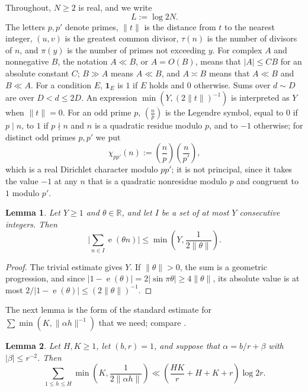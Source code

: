 \documentclass[11pt]{amsart}
\numberwithin{equation}{section}
\numberwithin{figure}{section}
\newtheorem{lemma}{Lemma}[section]
\theoremstyle{definition}
\newcommand{\R}{\mathbb{R}}
\newcommand{\e}{\operatorname{e}}
\begin{document}
Throughout, $N\ge2$ is real, and we write
\begin{equation}\label{eq:L-def}
  L:=\log 2N.
\end{equation}
The letters $p,p'$ denote primes, $\|t\|$ is the distance from $t$ to the
nearest integer, $(u,v)$ is the greatest common divisor, $\tau(n)$ is the
number of divisors of $n$, and $\pi(y)$ is the number of primes not
exceeding $y$.  For complex $A$ and nonnegative $B$, the notation $A\ll B$,
or $A=O(B)$, means that $|A|\le CB$ for an absolute constant $C$; $B\gg A$
means $A\ll B$, and $A\asymp B$ means that $A\ll B$ and $B\ll A$.  For a
condition $E$, $\mathbf1_E$ is $1$ if $E$ holds and $0$ otherwise.  Sums over $d\sim D$ are over
$D<d\le2D$.  An expression $\min(Y,(2\|t\|)^{-1})$ is interpreted as $Y$
when $\|t\|=0$.  For an odd prime $p$, $(\tfrac np)$ is the Legendre
symbol, equal to $0$ if $p\mid n$, to $1$ if $p\nmid n$ and $n$ is a
quadratic residue modulo $p$, and to $-1$ otherwise; for distinct odd
primes $p,p'$ we put
\begin{equation}\label{eq:chi-def}
  \chi_{pp'}(n):=\left(\frac np\right)\left(\frac n{p'}\right),
\end{equation}
which is a real Dirichlet character modulo $pp'$; it is not principal,
since it takes the value $-1$ at any $n$ that is a quadratic nonresidue
modulo $p$ and congruent to $1$ modulo $p'$.

\begin{lemma}\label{lem:geometric}
Let $Y\ge1$ and $\theta\in\R$, and let $I$ be a set of at most $Y$
consecutive integers.  Then
\[
  \bigg|\sum_{n\in I}\e(\theta n)\bigg|\le\min\left(Y,\frac1{2\|\theta\|}\right).
\]
\end{lemma}

\begin{proof}
The trivial estimate gives $Y$.  If $\|\theta\|>0$, the sum is a
geometric progression, and since
$|1-\e(\theta)|=2|\sin\pi\theta|\ge4\|\theta\|$, its absolute value is at
most $2/|1-\e(\theta)|\le(2\|\theta\|)^{-1}$.
\end{proof}

The next lemma is the form of the standard estimate for
$\sum\min(K,\|\alpha h\|^{-1})$ that we need; compare
\cite[Lemma~2.2]{Vaughan}.

\begin{lemma}\label{lem:spacing}
Let $H,K\ge1$, let $(b,r)=1$, and suppose that $\alpha=b/r+\beta$ with
$|\beta|\le r^{-2}$.  Then
\begin{equation}\label{eq:spacing}
  \sum_{1\le h\le H}\min\left(K,\frac1{2\|\alpha h\|}\right)
  \ll\left(\frac{HK}r+H+K+r\right)\log 2r.
\end{equation}
\end{lemma}
\end{document}
